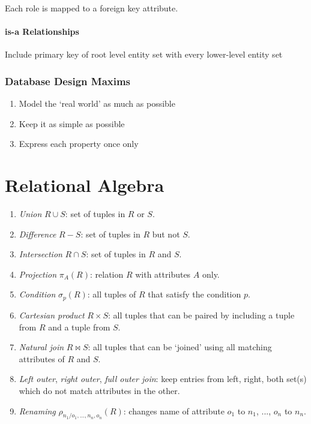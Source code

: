 \documentclass[twocolumn,english]{article}
\begin{document}
Each role is mapped to a foreign key attribute.


\paragraph{is-a Relationships}

Include primary key of root level entity set with every lower-level
entity set


\subsubsection{Database Design Maxims}
\begin{enumerate}
\item Model the `real world' as much as possible 
\item Keep it as simple as possible 
\item Express each property once only 
\end{enumerate}

\section{Relational Algebra}
\begin{enumerate}
\item \emph{Union} $R\cup S$: set of tuples in $R$ or $S$. 
\item \emph{Difference} $R-S$: set of tuples in $R$ but not $S$. 
\item \emph{Intersection} $R\cap S$: set of tuples in $R$ and $S$. 
\item \emph{Projection} $\pi_{A}(R)$: relation $R$ with attributes $A$
only. 
\item \emph{Condition} $\sigma_{p}(R)$: all tuples of $R$ that satisfy
the condition $p$. 
\item \emph{Cartesian product} $R\times S$: all tuples that can be paired
by including a tuple from $R$ and a tuple from $S$. 
\item \emph{Natural join} $R\bowtie S$: all tuples that can be `joined'
using all matching attributes of $R$ and $S$. 
\item \emph{Left outer}, \emph{right outer}, \emph{full outer join}: keep
entries from left, right, both set(s) which do not match attributes
in the other. 
\item \emph{Renaming} $\rho_{n_{1}/o_{1},\dots,n_{n},o_{n}}(R)$: changes
name of attribute $o_{1}$ to $n_{1}$, ..., $o_{n}$ to $n_{n}$. 
\end{enumerate}
\end{document}
